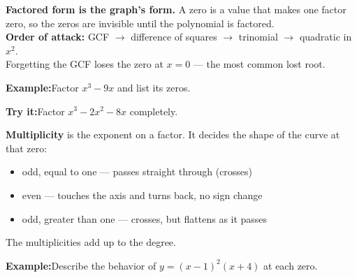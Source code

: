 \documentclass[12pt]{article}
\begin{document}


\begin{formulabox}
\textbf{Factored form is the graph's form.} A zero is a value that makes one
factor zero, so the zeros are invisible until the polynomial is factored.\\[3pt]
\textbf{Order of attack:} GCF $\rightarrow$ difference of squares
$\rightarrow$ trinomial $\rightarrow$ quadratic in $x^2$.\\[3pt]
Forgetting the GCF loses the zero at $x = 0$ --- the most common lost root.
\end{formulabox}

\begin{examplebox}
\textbf{Example:}\quad Factor $x^3 - 9x$ and list its zeros.
\end{examplebox}

\begin{tryitbox}
\textbf{Try it:}\quad Factor $x^3 - 2x^2 - 8x$ completely.\\[2pt]
\end{tryitbox}


\begin{formulabox}
\textbf{Multiplicity} is the exponent on a factor. It decides the shape of the
curve at that zero:
\begin{itemize}[leftmargin=1.3cm, itemsep=1pt, topsep=2pt]
  \item odd, equal to one --- passes straight through (crosses)
  \item even --- touches the axis and turns back, no sign change
  \item odd, greater than one --- crosses, but flattens as it passes
\end{itemize}
The multiplicities add up to the degree.
\end{formulabox}

\begin{examplebox}
\textbf{Example:}\quad Describe the behavior of $y = (x-1)^2(x+4)$ at each zero.
\end{examplebox}
\end{document}
